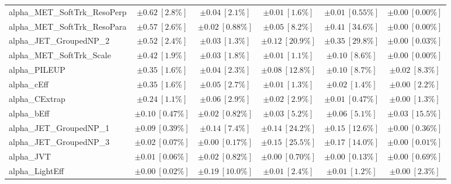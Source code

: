 \begin{sidewaystable}
\begin{center}
\begin{tabular*}{\textwidth}{@{\extracolsep{\fill}}lccccc}
alpha\_MET\_SoftTrk\_ResoPerp         & $\pm 0.62\ [2.8\%] $          & $\pm 0.04\ [2.1\%] $          & $\pm 0.01\ [1.6\%] $          & $\pm 0.01\ [0.55\%] $          & $\pm 0.00\ [0.00\%] $       \\
alpha\_MET\_SoftTrk\_ResoPara         & $\pm 0.57\ [2.6\%] $          & $\pm 0.02\ [0.88\%] $          & $\pm 0.05\ [8.2\%] $          & $\pm 0.41\ [34.6\%] $          & $\pm 0.00\ [0.00\%] $       \\
alpha\_JET\_GroupedNP\_2         & $\pm 0.52\ [2.4\%] $          & $\pm 0.03\ [1.3\%] $          & $\pm 0.12\ [20.9\%] $          & $\pm 0.35\ [29.8\%] $          & $\pm 0.00\ [0.03\%] $       \\
alpha\_MET\_SoftTrk\_Scale         & $\pm 0.42\ [1.9\%] $          & $\pm 0.03\ [1.8\%] $          & $\pm 0.01\ [1.1\%] $          & $\pm 0.10\ [8.6\%] $          & $\pm 0.00\ [0.00\%] $       \\
alpha\_PILEUP         & $\pm 0.35\ [1.6\%] $          & $\pm 0.04\ [2.3\%] $          & $\pm 0.08\ [12.8\%] $          & $\pm 0.10\ [8.7\%] $          & $\pm 0.02\ [8.3\%] $       \\
alpha\_cEff         & $\pm 0.35\ [1.6\%] $          & $\pm 0.05\ [2.7\%] $          & $\pm 0.01\ [1.3\%] $          & $\pm 0.02\ [1.4\%] $          & $\pm 0.00\ [2.2\%] $       \\
alpha\_CExtrap         & $\pm 0.24\ [1.1\%] $          & $\pm 0.06\ [2.9\%] $          & $\pm 0.02\ [2.9\%] $          & $\pm 0.01\ [0.47\%] $          & $\pm 0.00\ [1.3\%] $       \\
alpha\_bEff         & $\pm 0.10\ [0.47\%] $          & $\pm 0.02\ [0.82\%] $          & $\pm 0.03\ [5.2\%] $          & $\pm 0.06\ [5.1\%] $          & $\pm 0.03\ [15.5\%] $       \\
alpha\_JET\_GroupedNP\_1         & $\pm 0.09\ [0.39\%] $          & $\pm 0.14\ [7.4\%] $          & $\pm 0.14\ [24.2\%] $          & $\pm 0.15\ [12.6\%] $          & $\pm 0.00\ [0.36\%] $       \\
alpha\_JET\_GroupedNP\_3         & $\pm 0.02\ [0.07\%] $          & $\pm 0.00\ [0.17\%] $          & $\pm 0.15\ [25.5\%] $          & $\pm 0.17\ [14.0\%] $          & $\pm 0.00\ [0.01\%] $       \\
alpha\_JVT         & $\pm 0.01\ [0.06\%] $          & $\pm 0.02\ [0.82\%] $          & $\pm 0.00\ [0.70\%] $          & $\pm 0.00\ [0.13\%] $          & $\pm 0.00\ [0.69\%] $       \\
alpha\_LightEff         & $\pm 0.00\ [0.02\%] $          & $\pm 0.19\ [10.0\%] $          & $\pm 0.01\ [2.4\%] $          & $\pm 0.01\ [1.2\%] $          & $\pm 0.00\ [2.3\%] $       \\

\end{tabular*}
\end{center}
\end{sidewaystable}

